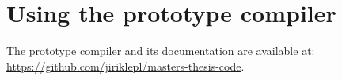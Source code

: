 \chapter{Using the prototype compiler}
\label{chap:proto}

The prototype compiler and its documentation are available at: \url{https://github.com/jiriklepl/masters-thesis-code}.
